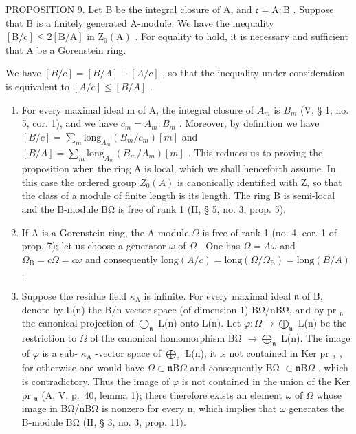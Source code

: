 PROPOSITION 9. Let B be the integral closure of A, and \(\mathfrak{c} = \mathrm{A}:\mathrm{B}\) . Suppose that B is a finitely generated A-module. We have the inequality \([\mathrm{B} / \mathrm{c}] \leqslant 2[\mathrm{B} / \mathrm{A}]\) in \(\mathrm{Z}_0(\mathrm{A})\) . For equality to hold, it is necessary and sufficient that A be a Gorenstein ring.

We have \([B/c] = [B/A] + [A/c]\) , so that the inequality under consideration is equivalent to \([A/c] \leqslant [B/A]\) .

\begin{enumerate}
\def\labelenumi{\Alph{enumi})}
\item
  For every maximal ideal m of A, the integral closure of \(A_{m}\) is \(B_{m}\) (V, § 1, no. 5, cor. 1), and we have \(c_{m} = A_{m} : B_{m}\) . Moreover, by definition we have \([B/c] = \sum_{m} \text{long}_{A_{m}}(B_{m}/c_{m})[m]\) and \([B/A] = \sum_{m} \text{long}_{A_{m}}(B_{m}/A_{m})[m]\) . This reduces us to proving the proposition when the ring A is local, which we shall henceforth assume. In this case the ordered group \(Z_{0}(A)\) is canonically identified with Z, so that the class of a module of finite length is its length. The ring B is semi-local and the B-module BΩ is free of rank 1 (II, § 5, no. 3, prop. 5).
\item
  If A is a Gorenstein ring, the A-module \(\Omega\) is free of rank 1 (no. 4, cor. 1 of prop. 7); let us choose a generator \(\omega\) of \(\Omega\) . One has \(\Omega = A\omega\) and \(\Omega_{\mathrm{B}} = c\Omega = c\omega\) and consequently \(\text{long}(A/c) = \text{long}(\Omega/\Omega_{\mathrm{B}}) = \text{long}(B/A)\) .
\item
  Suppose the residue field \(\kappa_{\mathrm{A}}\) is infinite. For every maximal ideal \(\mathfrak{n}\) of B, denote by L(n) the B/n-vector space (of dimension 1) BΩ/nBΩ, and by pr \(_{\mathfrak{n}}\) the canonical projection of \(\bigoplus_{\mathfrak{n}}\) L(n) onto L(n). Let \(\varphi : \Omega \longrightarrow \bigoplus_{\mathfrak{n}}\) L(n) be the restriction to \(\Omega\) of the canonical homomorphism BΩ \(\longrightarrow \bigoplus_{\mathfrak{n}}\) L(n). The image of \(\varphi\) is a sub- \(\kappa_{\mathrm{A}}\) -vector space of \(\bigoplus_{\mathfrak{n}}\) L(n); it is not contained in Ker pr \(_{\mathfrak{n}}\) , for otherwise one would have \(\Omega \subset \mathfrak{n}\mathrm{B}\Omega\) and consequently BΩ \(\subset \mathfrak{n}\mathrm{B}\Omega\) , which is contradictory. Thus the image of \(\varphi\) is not contained in the union of the Ker pr \(_{\mathfrak{n}}\) (A, V, p.~40, lemma 1); there therefore exists an element \(\omega\) of \(\Omega\) whose image in BΩ/nBΩ is nonzero for every n, which implies that \(\omega\) generates the B-module BΩ (II, § 3, no. 3, prop. 11).
\end{enumerate}

